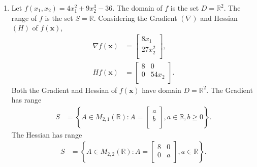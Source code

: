 \documentclass[a4paper,11pt]{article}
\newcommand{\ds}{\displaystyle}
\begin{document}
{{\begin{enumerate}[leftmargin=*]
\begin{enumerate}[label=\alph*)]
			\item Let $\ds{f(x_1,x_2) = 4x_1^2 + 9x_2^3 - 36}$. The domain of $\ds{f}$ is the set  $\ds{D = \mathbb{R}^2}$. The range of $\ds{f}$ is the set $\ds{S = \mathbb{R}}$. Considering the Gradient $\ds{(\nabla)}$ and Hessian $\ds{(H)}$ of $\ds{f(\mathbf{x})}$, 
				\begin{align*}
					\nabla f(\mathbf{x}) & = 
					\begin{bmatrix}
						8x_1 \\
						27x_2^2 \\
					\end{bmatrix}, \\
					Hf(\mathbf{x}) & = 
					\begin{bmatrix}
						8 & 0 \\
						0 & 54x_2 \\
					\end{bmatrix}.
				\end{align*}
				Both the Gradient and Hessian of $\ds{f(\mathbf{x})}$ have domain $\ds{D = \mathbb{R}^2}$. The Gradient has range 
				\begin{align*} S & = \left\{A \in M_{2,1}(\mathbb{R}) : A =
						\begin{bmatrix}
							a \\
							b \\
						\end{bmatrix},
					a \in \mathbb{R}, b \geq 0 \right\}.
				\end{align*}
				The Hessian has range
				\begin{align*} S & = \left\{A \in M_{2,2}(\mathbb{R}) : A =
						\begin{bmatrix}
							8 & 0 \\
							0 & a \\
						\end{bmatrix},
					a \in \mathbb{R} \right\}.
				\end{align*}


\end{enumerate}
\end{enumerate}}}
\end{document}
